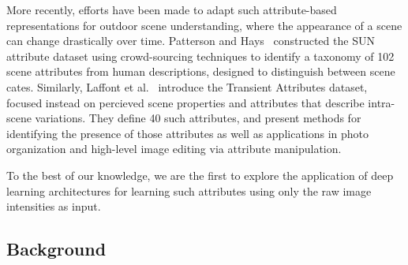 \documentclass{article}
\newcommand{\todo}[1]{\textcolor{red}{todo: {\em #1}}}
\begin{document}
More recently, efforts have been made to adapt such attribute-based
representations for outdoor scene understanding, where the appearance
of a scene can change drastically over time.  Patterson and
Hays~\cite{patterson2012sun} constructed the SUN attribute dataset
using crowd-sourcing techniques to identify a taxonomy of 102 scene
attributes from human descriptions, designed to distinguish between
scene cates. Similarly, Laffont et al.~\cite{Laffont14} introduce the
Transient Attributes dataset, focused instead on percieved scene
properties and attributes that describe intra-scene variations. They
define 40 such attributes, and present methods for identifying the
presence of those attributes as well as applications in photo
organization and high-level image editing via attribute manipulation. 

To the best of our knowledge, we are the first to explore the
application of deep learning architectures for learning such
attributes using only the raw image intensities as input.

%
%

%
%
%
%


\subsection{Background}
\end{document}
